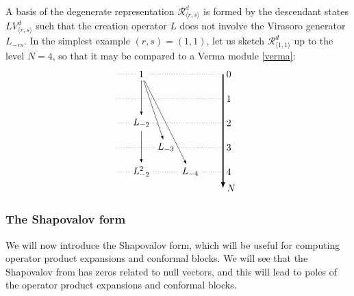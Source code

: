 \documentclass[12pt, a4paper]{article}
\begin{document}
A basis of the degenerate representation $\mathcal{R}^d_{\langle r,s\rangle}$ is formed by the descendant states $LV^d_{\langle r,s\rangle}$ such that the creation operator $L$ does not involve the Virasoro generator $L_{-rs}$. In the simplest example $(r,s)=(1,1)$, let us sketch $\mathcal{R}^d_{\langle 1,1\rangle}$ up to the level $N=4$, so that it may be compared to a Verma module \eqref{verma}:
 \begin{align}
 \begin{tikzpicture}[scale = .15, baseline=(current  bounding  box.center)]
  \draw[-latex, very thick] (20, 0) -- (20, -28) node [right] {$N$};
  \foreach \x in {0, ..., 4}
  {
  \draw [dotted] (-6, {-6*\x}) -- (20, {-6*\x}) node [right] {${\x}$};
  }
  \node[fill = white] at (0, 0) (0) {$1$};
  \node[fill = white] at (0,-12) (2) {$L_{-2}$};
  \node[fill = white] at (0,-24) (22) {$L_{-2}^2$};
  \node[fill = white] at (6,-18) (3) {$L_{-3}$};
  \node[fill = white] at (12,-24) (4) {$L_{-4}$};
  \draw[-latex] (0) -- (2);
  \draw[-latex] (0) -- (3);
  \draw[-latex] (0) -- (4);
  \draw[-latex] (2) -- (22);
 \end{tikzpicture}
 \label{r11}
\end{align}

\subsubsection{The Shapovalov form}

We will now introduce the Shapovalov form, which will be useful for computing operator product expansions and conformal blocks. We will see that the Shapovalov from has zeros related to null vectors, and this will lead to poles of the operator product expansions and conformal blocks.
\end{document}

